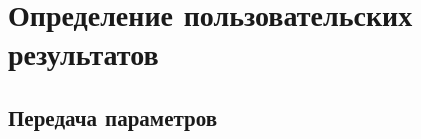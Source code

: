 \section{Определение пользовательских результатов}\label{common-lisp:baseconstructions:defun}
\subsection{Передача параметров}\label{common-lisp:baseconstructions:defun:parameters}

